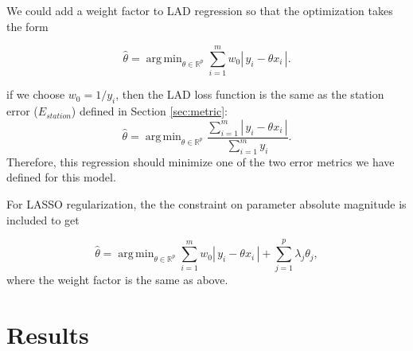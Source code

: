 \documentclass[11pt]{article}
\DeclareMathOperator*{\argmin}{arg\,min}
\begin{document}
We could add a weight factor to LAD regression so that the optimization takes the form

\[\hat{\theta} = \argmin_{\theta\in\mathbb{R}^p}\sum_{i=1}^m w_0\left|\,y_i - \theta x_i\,\right|.\]

if we choose $w_0 = 1 / y_i$, then the LAD loss function is the same as the station error ($E_{station}$) defined in Section \ref{sec:metric}:
\[\hat{\theta} = \argmin_{\theta\in\mathbb{R}^p}\displaystyle\frac{\sum\limits_{i=1}^m \left|\,y_i - \theta x_i\,\right|}{\sum\limits_{i=1}^{m}y_i}.\] Therefore, this regression should minimize one of the two error metrics we have defined for this model. 

For LASSO regularization, the the constraint on parameter absolute magnitude is included to get

\[\hat{\theta} = \argmin_{\theta\in\mathbb{R}^p}\sum_{i=1}^m w_0\left|\,y_i - \theta x_i\,\right| + \sum_{j=1}^p\lambda_j\theta_j,\] where the weight factor is the same as above.






\section{Results}
\end{document}
